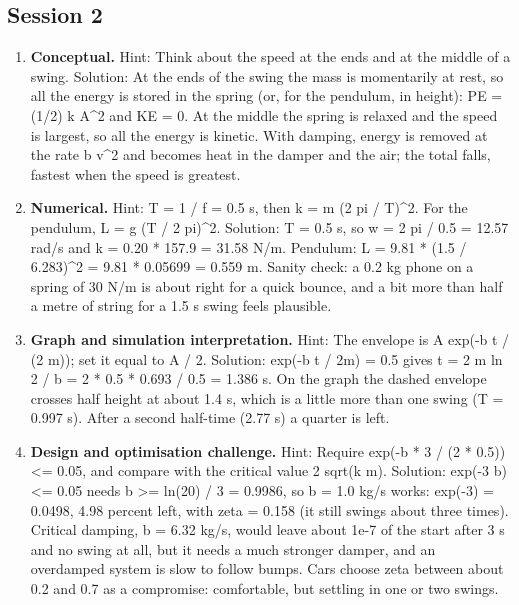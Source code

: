 \documentclass[11pt,a4paper]{article}
\begin{document}
\subsection*{Session 2}
\begin{enumerate}[nosep]
\item \textbf{Conceptual.} Hint: Think about the speed at the ends and at the middle of a swing. Solution: At the ends of the swing the mass is momentarily at rest, so all the energy is stored in the spring (or, for the pendulum, in height): PE = (1/2) k A\textasciicircum{}2 and KE = 0. At the middle the spring is relaxed and the speed is largest, so all the energy is kinetic. With damping, energy is removed at the rate b v\textasciicircum{}2 and becomes heat in the damper and the air; the total falls, fastest when the speed is greatest.
\item \textbf{Numerical.} Hint: T = 1 / f = 0.5 s, then k = m (2 pi / T)\textasciicircum{}2. For the pendulum, L = g (T / 2 pi)\textasciicircum{}2. Solution: T = 0.5 s, so w = 2 pi / 0.5 = 12.57 rad/s and k = 0.20 * 157.9 = 31.58 N/m. Pendulum: L = 9.81 * (1.5 / 6.283)\textasciicircum{}2 = 9.81 * 0.05699 = 0.559 m. Sanity check: a 0.2 kg phone on a spring of 30 N/m is about right for a quick bounce, and a bit more than half a metre of string for a 1.5 s swing feels plausible.
\item \textbf{Graph and simulation interpretation.} Hint: The envelope is A exp(-b t / (2 m)); set it equal to A / 2. Solution: exp(-b t / 2m) = 0.5 gives t = 2 m ln 2 / b = 2 * 0.5 * 0.693 / 0.5 = 1.386 s. On the graph the dashed envelope crosses half height at about 1.4 s, which is a little more than one swing (T = 0.997 s). After a second half-time (2.77 s) a quarter is left.
\item \textbf{Design and optimisation challenge.} Hint: Require exp(-b * 3 / (2 * 0.5)) \textless{}= 0.05, and compare with the critical value 2 sqrt(k m). Solution: exp(-3 b) \textless{}= 0.05 needs b \textgreater{}= ln(20) / 3 = 0.9986, so b = 1.0 kg/s works: exp(-3) = 0.0498, 4.98 percent left, with zeta = 0.158 (it still swings about three times). Critical damping, b = 6.32 kg/s, would leave about 1e-7 of the start after 3 s and no swing at all, but it needs a much stronger damper, and an overdamped system is slow to follow bumps. Cars choose zeta between about 0.2 and 0.7 as a compromise: comfortable, but settling in one or two swings.
\end{enumerate}
\end{document}
